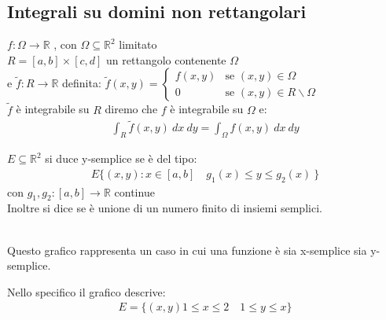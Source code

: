 \documentclass[a4paper, oneside]{article}
\begin{document}
\subsection{Integrali su domini non rettangolari}
\begin{definition}
     $f:\Omega \to \mathbb{R}$ , con $\Omega \subseteq \mathbb{R}^2$ limitato\\
     $R = [a,b] \times [c,d]$ un rettangolo contenente $\Omega$ \\
    e  $\tilde{f}:R \to \mathbb{R}$ definita: $\tilde{f}(x,y) = \begin{cases}
        f(x,y) & \text{se } (x,y) \in \Omega \\
        0 & \text{se } (x,y) \in R \backslash \Omega
    \end{cases}$\\
     $\tilde{f}$ è integrabile su $R$ diremo che $f$ è integrabile su $\Omega$ e:
    \begin{gather*}
        \int_{R} \tilde{f}(x,y) \ dx \ dy = \int_{\Omega} f(x,y) \ dx \ dy
    \end{gather*}
\end{definition}
\begin{definition}
    $E \subseteq \mathbb{R}^2$ si duce y-semplice se è del tipo:
    \begin{gather*}
        E \{ (x,y):x \in [a,b] \quad g_1(x) \leq y \leq g_2(x) \ \}
    \end{gather*} 
    con $g_1,g_2:[a,b] \to \mathbb{R}$ continue\\
    Inoltre si dice  se è unione di un numero finito di insiemi semplici.
\end{definition}
\begin{center}
    \tiny
    \hfill\\
    Questo grafico rappresenta un caso in cui una funzione è sia x-semplice sia y-semplice.
    \normalsize
\end{center}
Nello specifico il grafico descrive:
\begin{gather*}
    E = \{ (x,y) 1 \leq x \leq 2 \quad 1\leq y \leq x \}
\end{gather*}
\end{document}
